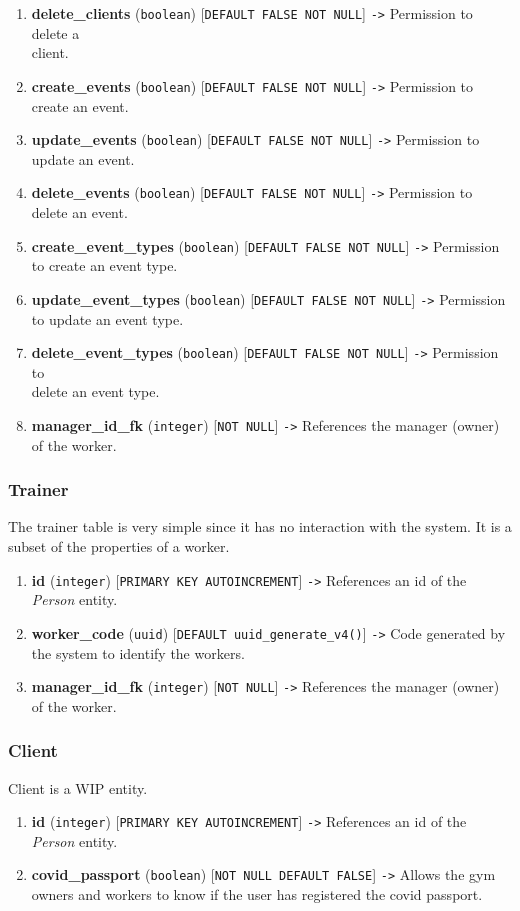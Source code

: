 \documentclass[a4paper, 12pt, oneside]{book}
\begin{document}
\begin{enumerate}[label = -]
	\item \textbf{delete\_clients} (\texttt{boolean}) [\texttt{DEFAULT FALSE NOT NULL}] \texttt{->} Permission to delete a\\client.
	\item \textbf{create\_events} (\texttt{boolean}) [\texttt{DEFAULT FALSE NOT NULL}] \texttt{->} Permission to create an event.
	\item \textbf{update\_events} (\texttt{boolean}) [\texttt{DEFAULT FALSE NOT NULL}] \texttt{->} Permission to update an event.
	\item \textbf{delete\_events} (\texttt{boolean}) [\texttt{DEFAULT FALSE NOT NULL}] \texttt{->} Permission to\\delete an event.
	\item \textbf{create\_event\_types} (\texttt{boolean}) [\texttt{DEFAULT FALSE NOT NULL}] \texttt{->} Permission to create an event type.
	\item \textbf{update\_event\_types} (\texttt{boolean}) [\texttt{DEFAULT FALSE NOT NULL}] \texttt{->} Permission to update an event type.
	\item \textbf{delete\_event\_types} (\texttt{boolean}) [\texttt{DEFAULT FALSE NOT NULL}] \texttt{->} Permission to\\delete an event type.
	\item \textbf{manager\_id\_fk} (\texttt{integer}) [\texttt{NOT NULL}] \texttt{->} References the manager (owner) of the worker.
\end{enumerate}
\subsubsection{Trainer}
The trainer table is very simple since it has no interaction with the system. It is a subset of the properties of a worker.
\begin{enumerate}[label = -]
	\item \textbf{id} (\texttt{integer}) [\texttt{PRIMARY KEY AUTOINCREMENT}] \texttt{->} References an id of the \emph{Person} entity.
	\item \textbf{worker\_code} (\texttt{uuid}) [\texttt{DEFAULT uuid\_generate\_v4()}] \texttt{->} Code generated by the system to identify the workers.
	\item \textbf{manager\_id\_fk} (\texttt{integer}) [\texttt{NOT NULL}] \texttt{->} References the manager (owner) of the worker.
\end{enumerate}
\subsubsection{Client}
Client is a WIP entity.
\begin{enumerate}[label = -]
	\item \textbf{id} (\texttt{integer}) [\texttt{PRIMARY KEY AUTOINCREMENT}] \texttt{->} References an id of the \emph{Person} entity.
	\item \textbf{covid\_passport} (\texttt{boolean}) [\texttt{NOT NULL DEFAULT FALSE}] \texttt{->} Allows the gym owners and workers to know if the user has registered the covid passport.
\end{enumerate}
\end{document}
